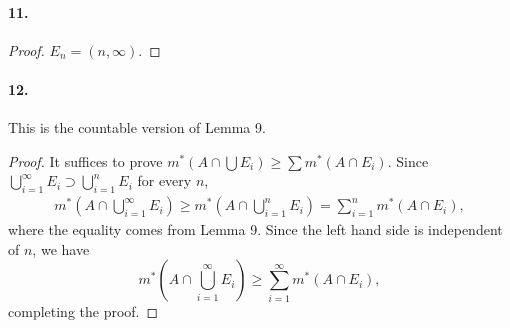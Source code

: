   \paragraph{11.}
  \begin{proof}
    $E_n = (n,\infty)$.
  \end{proof}

  \paragraph{12.}
    This is the countable version of Lemma 9.
  \begin{proof}
    It suffices to prove $m^*(A\cap \bigcup E_i) \ge \sum m^*(A\cap E_i)$. Since
    $\bigcup_{i=1}^\infty E_i\supset \bigcup_{i=1}^n E_i$ for every $n$, 
    \begin{align*}
      m^*\left(A\cap \bigcup_{i=1}^\infty E_i\right)
      \ge m^*\left(A\cap \bigcup_{i=1}^n E_i\right)
      = \sum_{i=1}^n m^*(A\cap E_i),
    \end{align*}
    where the equality comes from Lemma 9. Since the left hand side is 
    independent of $n$, we have
    \[
      m^*\left(A\cap \bigcup_{i=1}^\infty E_i\right) \ge
      \sum_{i=1}^\infty m^*(A\cap E_i),
    \]
    completing the proof.
  \end{proof}


